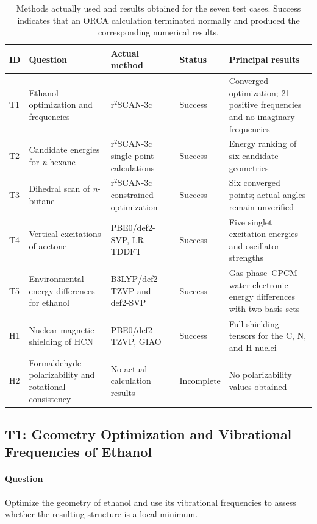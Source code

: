 \documentclass[a4paper,11pt]{article}
\begin{document}
\begin{table}[H]
  \centering\small
  \caption{Methods actually used and results obtained for the seven test cases.
  Success indicates that an ORCA calculation terminated normally and produced the corresponding numerical results.
  }
  \label{tab:task-overview}
  \begin{tabularx}{\linewidth}{l>{\raggedright\arraybackslash}p{2.6cm}>{\raggedright\arraybackslash}p{3.1cm}>{\raggedright\arraybackslash}p{1.8cm}Y}
    \toprule
    ID & Question & Actual method & Status & Principal results\\
    \midrule
    T1 & Ethanol optimization and frequencies & r$^{2}$SCAN-3c & Success & Converged optimization; 21 positive frequencies and no imaginary frequencies\\
    T2 & Candidate energies for \textit{n}-hexane & r$^{2}$SCAN-3c single-point calculations & Success & Energy ranking of six candidate geometries\\
    T3 & Dihedral scan of \textit{n}-butane & r$^{2}$SCAN-3c constrained optimization & Success & Six converged points; actual angles remain unverified\\
    T4 & Vertical excitations of acetone & PBE0/def2-SVP, LR-TDDFT & Success & Five singlet excitation energies and oscillator strengths\\
    T5 & Environmental energy differences for ethanol & B3LYP/def2-TZVP and def2-SVP & Success & Gas-phase--CPCM water electronic energy differences with two basis sets\\
    H1 & Nuclear magnetic shielding of HCN & PBE0/def2-TZVP, GIAO & Success & Full shielding tensors for the C, N, and H nuclei\\
    H2 & Formaldehyde polarizability and rotational consistency & No actual calculation results & Incomplete & No polarizability values obtained\\
    \bottomrule
  \end{tabularx}
\end{table}

\subsection{T1: Geometry Optimization and Vibrational Frequencies of Ethanol}
\paragraph{Question}
Optimize the geometry of ethanol and use its vibrational frequencies to assess whether the resulting structure is a local minimum.
\end{document}
